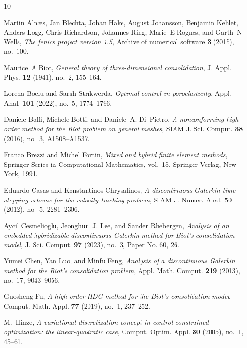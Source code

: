 \documentclass{amsart}
\begin{document}
\begin{thebibliography}{10}

Martin Aln{\ae}s, Jan Blechta, Johan Hake, August Johansson, Benjamin Kehlet,
  Anders Logg, Chris Richardson, Johannes Ring, Marie~E Rognes, and Garth~N
  Wells, \emph{The fenics project version 1.5}, Archive of numerical software
  \textbf{3} (2015), no.~100.

Maurice~A Biot, \emph{General theory of three-dimensional consolidation}, J.
  Appl. Phys. \textbf{12} (1941), no.~2, 155--164.

Lorena Bociu and Sarah Strikwerda, \emph{Optimal control in poroelasticity},
  Appl. Anal. \textbf{101} (2022), no.~5, 1774--1796. 

Daniele Boffi, Michele Botti, and Daniele~A. Di~Pietro, \emph{A nonconforming
  high-order method for the {B}iot problem on general meshes}, SIAM J. Sci.
  Comput. \textbf{38} (2016), no.~3, A1508--A1537. 

Franco Brezzi and Michel Fortin, \emph{Mixed and hybrid finite element
  methods}, Springer Series in Computational Mathematics, vol.~15,
  Springer-Verlag, New York, 1991. 

Eduardo Casas and Konstantinos Chrysafinos, \emph{A discontinuous {G}alerkin
  time-stepping scheme for the velocity tracking problem}, SIAM J. Numer. Anal.
  \textbf{50} (2012), no.~5, 2281--2306. 

Aycil Cesmelioglu, Jeonghun~J. Lee, and Sander Rhebergen, \emph{Analysis of an
  embedded-hybridizable discontinuous {G}alerkin method for {B}iot's
  consolidation model}, J. Sci. Comput. \textbf{97} (2023), no.~3, Paper No.
  60, 26. 

Yumei Chen, Yan Luo, and Minfu Feng, \emph{Analysis of a discontinuous
  {G}alerkin method for the {B}iot's consolidation problem}, Appl. Math.
  Comput. \textbf{219} (2013), no.~17, 9043--9056. 

Guosheng Fu, \emph{A high-order {HDG} method for the {B}iot's consolidation
  model}, Comput. Math. Appl. \textbf{77} (2019), no.~1, 237--252. 

M.~Hinze, \emph{A variational discretization concept in control constrained
  optimization: the linear-quadratic case}, Comput. Optim. Appl. \textbf{30}
  (2005), no.~1, 45--61. 


\end{thebibliography}
\end{document}
